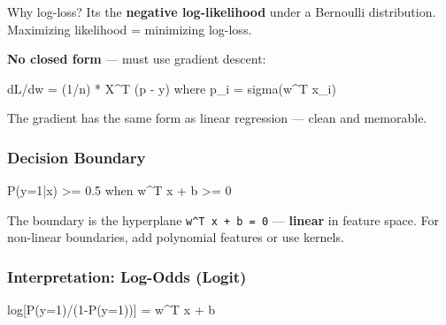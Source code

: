 \documentclass[11pt]{article}
\newenvironment{Shaded}{\begin{snugshade}}{\end{snugshade}}
\newcommand{\DecValTok}[1]{\textcolor[rgb]{0.96,0.45,0.00}{#1}}
\newcommand{\FloatTok}[1]{\textcolor[rgb]{0.96,0.45,0.00}{#1}}
\newcommand{\NormalTok}[1]{\textcolor[rgb]{0.81,0.81,0.76}{#1}}
\newcommand{\OperatorTok}[1]{\textcolor[rgb]{0.81,0.81,0.76}{#1}}
\begin{document}
Why log-loss? It\textquotesingle s the \textbf{negative log-likelihood} under a Bernoulli distribution. Maximizing likelihood = minimizing log-loss.

\textbf{No closed form} --- must use gradient descent:


\begin{Shaded}
\begin{Highlighting}[]
\NormalTok{dL}\OperatorTok{/}\NormalTok{dw }\OperatorTok{=}\NormalTok{ (}\DecValTok{1}\OperatorTok{/}\NormalTok{n) }\OperatorTok{*}\NormalTok{ X}\OperatorTok{\^{}}\NormalTok{T (p }\OperatorTok{{-}}\NormalTok{ y)}
\NormalTok{        where p\_i }\OperatorTok{=}\NormalTok{ sigma(w}\OperatorTok{\^{}}\NormalTok{T x\_i)}
\end{Highlighting}
\end{Shaded}

The gradient has the same form as linear regression --- clean and memorable.

\subsubsection{Decision Boundary}\label{decision-boundary}


\begin{Shaded}
\begin{Highlighting}[]
\NormalTok{P(y}\OperatorTok{=}\DecValTok{1}\OperatorTok{|}\NormalTok{x) }\OperatorTok{\textgreater{}=} \FloatTok{0.5}\NormalTok{  when  w}\OperatorTok{\^{}}\NormalTok{T x }\OperatorTok{+}\NormalTok{ b }\OperatorTok{\textgreater{}=} \DecValTok{0}
\end{Highlighting}
\end{Shaded}

The boundary is the hyperplane \texttt{w\^{}T\ x\ +\ b\ =\ 0} --- \textbf{linear} in feature space. For non-linear boundaries, add polynomial features or use kernels.

\subsubsection{Interpretation: Log-Odds (Logit)}\label{interpretation-log-odds-logit}


\begin{Shaded}
\begin{Highlighting}[]
\NormalTok{log[P(y}\OperatorTok{=}\DecValTok{1}\NormalTok{)}\OperatorTok{/}\NormalTok{(}\DecValTok{1}\OperatorTok{{-}}\NormalTok{P(y}\OperatorTok{=}\DecValTok{1}\NormalTok{))] }\OperatorTok{=}\NormalTok{ w}\OperatorTok{\^{}}\NormalTok{T x }\OperatorTok{+}\NormalTok{ b}
\end{Highlighting}
\end{Shaded}
\end{document}
